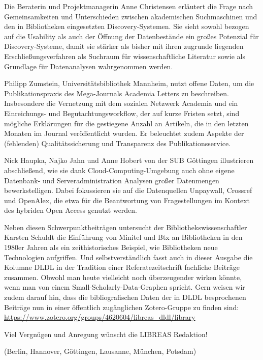 \documentclass[a4paper,
fontsize=11pt,
oneside,
numbers=noperiodatend,
parskip=half-,
bibliography=totoc,
final
]{scrartcl}
\begin{document}
Die Beraterin und Projektmanagerin Anne Christensen erläutert die Frage
nach Gemeinsamkeiten und Unterschieden zwischen akademischen
Suchmaschinen und den in Bibliotheken eingesetzten Discovery-Systemen.
Sie sieht sowohl bezogen auf die Usability als auch der Öffnung der
Datenbestände ein großes Potenzial für Discovery-Systeme, damit sie
stärker als bisher mit ihren zugrunde liegenden Erschließungsverfahren
als Suchraum für wissenschaftliche Literatur sowie als Grundlage für
Datenanalysen wahrgenommen werden.

Philipp Zumstein, Universitätsbibliothek Mannheim, nutzt offene Daten,
um die Publikationspraxis des Mega-Journals Academia Letters zu
beschreiben. Insbesondere die Vernetzung mit dem sozialen Netzwerk
Academia und ein Einreichungs- und Begutachtungsworkflow, der auf kurze
Fristen setzt, sind mögliche Erklärungen für die gestiegene Anzahl an
Artikeln, die in den letzten Monaten im Journal veröffentlicht wurden.
Er beleuchtet zudem Aspekte der (fehlenden) Qualitätssicherung und
Transparenz des Publikationsservice.

Nick Haupka, Najko Jahn und Anne Hobert von der SUB Göttingen
illustrieren abschließend, wie sie dank Cloud-Computing-Umgebung auch
ohne eigene Datenbank- und Serveradministration Analysen großer
Datenmengen bewerkstelligen. Dabei fokussieren sie auf die Datenquellen
Unpaywall, Crossref und OpenAlex, die etwa für die Beantwortung von
Fragestellungen im Kontext des hybriden Open Access genutzt werden.

Neben diesen Schwerpunktbeiträgen untersucht der
Bibliothekswissenschaftler Karsten Schuldt die Einführung von Minitel
und Btx an Bibliotheken in den 1980er Jahren als ein zeithistorisches
Beispiel, wie Bibliotheken neue Technologien aufgriffen. Und
selbstverständlich fasst auch in dieser Ausgabe die Kolumne DLDL in der
Tradition einer Referatezeitschrift fachliche Beiträge zusammen. Obwohl
man heute vielleicht noch überzeugender wirken könnte, wenn man von
einem Small-Scholarly-Data-Graphen spricht. Gern weisen wir zudem darauf
hin, dass die bibliografischen Daten der in DLDL besprochenen Beiträge
nun in einer öffentlich zugänglichen Zotero-Gruppe zu finden sind:
\url{https://www.zotero.org/groups/4620604/libreas_dldl/library}

Viel Vergnügen und Anregung wünscht die LIBREAS Redaktion!

(Berlin, Hannover, Göttingen, Lausanne, München, Potsdam)

\end{document}
